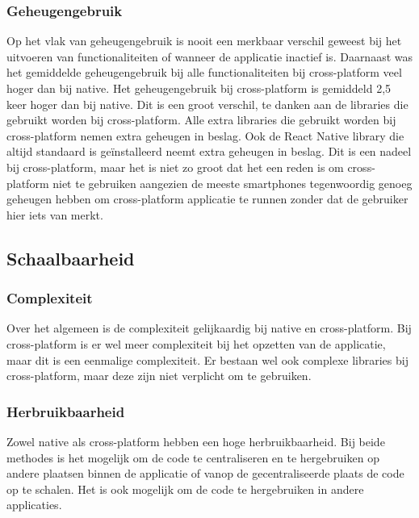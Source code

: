 \subsubsection{Geheugengebruik}
Op het vlak van geheugengebruik is nooit een merkbaar verschil geweest bij het uitvoeren van functionaliteiten 
of wanneer de applicatie inactief is. Daarnaast was het gemiddelde geheugengebruik bij alle functionaliteiten 
bij cross-platform veel hoger dan bij native. Het geheugengebruik bij cross-platform is gemiddeld 2,5 keer hoger
dan bij native. Dit is een groot verschil, te danken aan de libraries die gebruikt worden bij cross-platform.
Alle extra libraries die gebruikt worden bij cross-platform nemen extra geheugen in beslag. Ook de React 
Native library die altijd standaard is geïnstalleerd neemt extra geheugen in beslag. Dit is een nadeel bij
cross-platform, maar het is niet zo groot dat het een reden is om cross-platform niet te gebruiken aangezien 
de meeste smartphones tegenwoordig genoeg geheugen hebben om cross-platform applicatie te runnen zonder dat
de gebruiker hier iets van merkt.

\subsection{Schaalbaarheid}
\subsubsection{Complexiteit}
Over het algemeen is de complexiteit gelijkaardig bij native en cross-platform. Bij cross-platform is er wel
meer complexiteit bij het opzetten van de applicatie, maar dit is een eenmalige complexiteit. Er bestaan wel ook 
complexe libraries bij cross-platform, maar deze zijn niet verplicht om te gebruiken.

\subsubsection{Herbruikbaarheid}
Zowel native als cross-platform hebben een hoge herbruikbaarheid. Bij beide methodes is het mogelijk
om de code te centraliseren en te hergebruiken op andere plaatsen binnen de applicatie of vanop de 
gecentraliseerde plaats de code op te schalen. Het is ook mogelijk om de code te hergebruiken in 
andere applicaties.

